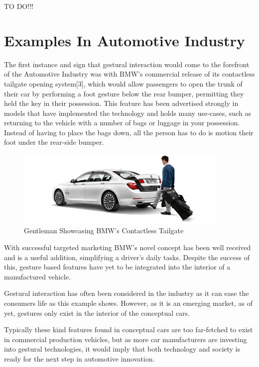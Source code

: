 \documentclass{l4proj}
\begin{document}
TO DO!!!

\section{Examples In Automotive Industry}
\vspace{-3mm}
The first instance and sign that gestural interaction would come to the forefront of the Automotive Industry was with BMW's commercial release of its contactless tailgate opening system[3], which would allow passengers to open the trunk of their car by performing a foot gesture below the rear bumper, permitting they held the key in their possession. This feature has been advertised strongly in models that have implemented the technology and holds many use-cases, such as returning to the vehicle with a number of bags or luggage in your possession. Instead of having to place the bags down, all the person has to do is motion their foot under the rear-side bumper. 
\begin{figure}[h!]
\centering
\includegraphics[width=4in]{images/contactless-tailgate.jpg}
\caption{Gentleman Showcasing BMW's Contactless Tailgate}
\label{fig:BMW}
\end{figure}

With successful targeted marketing BMW's novel concept has been well received and is a useful addition, simplifying a driver's daily tasks. Despite the success of this, gesture based features have yet to be integrated into the interior of a manufactured vehicle. 

Gestural interaction has often been considered in the industry as it can ease the consumers life as this example shows. However, as it is an emerging market, as of yet, gestures only exist in the interior of the conceptual cars.

Typically these kind features found in conceptual cars are too far-fetched to exist in commercial production vehicles, but as more car manufacturers are investing into gestural technologies, it would imply that both technology and society is ready for the next step in automotive innovation. 
\end{document}
